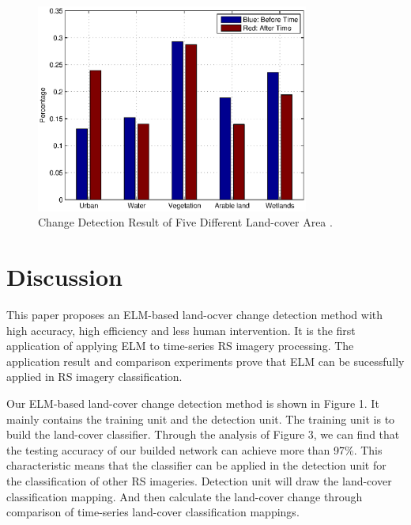 \documentclass{elsart}
\begin{document}
\begin{figure}[H]
\begin{center}
\includegraphics[width=0.8\textwidth]{dr2.eps}
\caption{Change Detection Result of Five Different Land-cover Area .}
\label{method}
\end{center}
\end{figure}
\par
 

\section{Discussion}
This paper proposes an ELM-based land-ocver change detection method with high accuracy, high efficiency and less human intervention.
It is the first application of applying ELM to time-series RS imagery processing.
The application result and comparison experiments prove that ELM can be sucessfully applied in RS imagery classification.
\par

Our ELM-based land-cover change detection method is shown in Figure 1.
It mainly contains the training unit and the detection unit.
The training unit is to build the land-cover classifier.
Through the analysis of Figure 3, we can find that the testing accuracy of our builded network can achieve more than 97\%.
This characteristic means that the classifier can be applied in the detection unit for the classification of other RS imageries.
Detection unit will draw the land-cover classification mapping.
And then calculate the land-cover change through comparison of time-series land-cover classification mappings.
\par
\end{document}
